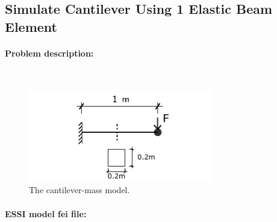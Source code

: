 \documentclass[fleqn,11pt]{article}
\begin{document}
\subsection{Simulate Cantilever Using 1 Elastic Beam Element} 
\paragraph{Problem description:} ~
% 
% 
% 
% 

\begin{figure}[!htb]
  \centering
  \includegraphics[width=8cm]{../Figure-files/_Chapter_Appendix_Illustrative_Examples/cantilever-mass.pdf}
  \caption{The cantilever-mass model.}
  \label{fig_cantilever_mass_1}
\end{figure}


\paragraph{ESSI model fei file: } ~
\end{document}
